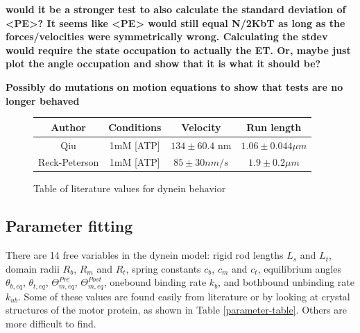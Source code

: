 \documentclass[10pt]{article} %
\begin{document}
\textbf{would it be a stronger test to also calculate the standard deviation of <PE>? It seems like <PE> would still equal N/2KbT as long as the forces/velocities were symmetrically wrong. Calculating the stdev would require the state occupation to actually the ET. Or, maybe just plot the angle occupation and show that it is what it should be?}

\textbf{Possibly do mutations on motion equations to show that tests are no longer behaved}

\begin{figure}[h]
  \centering
  \begin{tabular}{| c | c | c | c |}
    \hline
    Author & Conditions & Velocity & Run length\\\hline
    Qiu \cite{weihongpaper} & 1mM [ATP] & $134 \pm 60.4$ nm & $1.06 \pm 0.044 \mu m$\\ \hline
    Reck-Peterson \cite{reck2006single} & 1mM [ATP] & $85 \pm 30 nm/s$  & $1.9 \pm 0.2 \mu m$\\ \hline
  \end{tabular}
  \caption{Table of literature values for dynein behavior}
  \label{table:parameter-table}
\end{figure}




\subsection{Parameter fitting}
There are 14 free variables in the dynein model: rigid rod lengths $L_s$ and $L_t$, domain radii $R_b$, $R_m$ and $R_t$, spring constants $c_b$, $c_m$ and $c_t$, equilibrium angles $\theta_{b,eq}$, $\theta_{t,eq}$, $\Theta_{m,eq}^{Pre}$, $\Theta_{m,eq}^{Post}$, onebound binding rate $k_b$, and bothbound unbinding rate $k_{ub}$. Some of these values are found easily from literature or by looking at crystal structures of the motor protein, as shown in Table \ref{parameter-table}. Others are more difficult to find.\\
\end{document}
